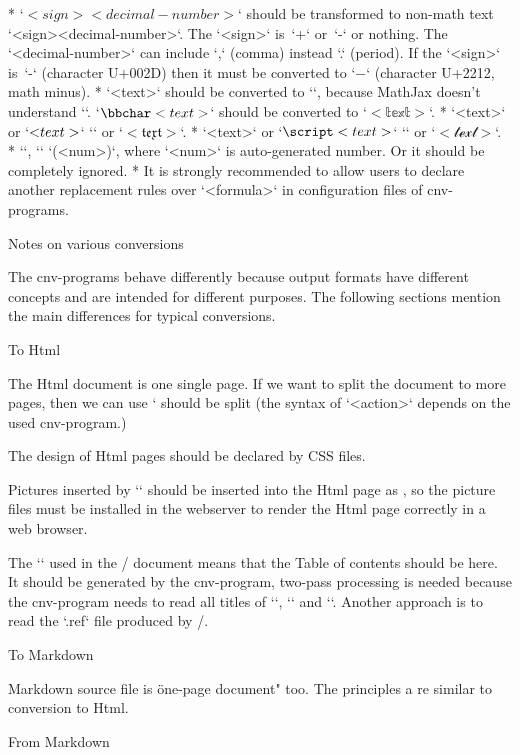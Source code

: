 \begitems
* `$<sign><decimal-number>$` should be transformed to non-math text
  `<sign><decimal-number>`. The `<sign>` is~`+` or~`-` or nothing.
  The `<decimal-number>` can include `,` (comma) instead `.` (period).
  If the `<sign>` is~`-` (character U+002D) then
  it must be converted to `−` (character U+2212, math minus).
* `{\bbchar <text>}` should be converted to ``, because
  MathJax doesn't understand `\bbchar`. `$\bbchar <text>$` should be
  converted to `$\mathbb{<text>}$`.
* `{\frak <text>}` or `$\frak <text>$` \:
  `` or `$\mathfrak{<text>}$`.
* `{\script <text>}` or `$\script <text>$` \:
  `` or `$\mathscr{<text>}$`.
* `\eqmark`, `\eqmark[<label>]` \: `\leqno (<num>)`, where `<num>` is
  auto-generated number. Or it should be completely ignored.
* It is strongly recommended to allow users to declare another replacement
  rules over `<formula>` in configuration files of cnv-programs.
\enditems


\sec Notes on various conversions

The cnv-programs behave differently because output formats have different
concepts and are intended for different purposes. The following sections
mention the main differences for typical conversions.

\secc To Html

The Html document is one single page. If we want to split the document to more
pages, then we can use `%
should be split (the syntax of `<action>` depends on the used cnv-program.)

The design of Html pages should be declared by CSS files.

Pictures inserted by `\inspic` should be inserted into the Html page as
, so the picture files must be installed in
the webserver to render the Html page correctly in a web browser.

The `\maketoc` used in the \OpTeX/ document means that the Table of contents should
be here. It should be generated by the cnv-program, two-pass processing is
needed because the cnv-program needs to read all titles of `\chap`, `\sec` and
`\secc`. Another approach is to read the `.ref` file produced by \OpTeX/.


\secc To Markdown

Markdown source file is \"one-page document" too. The principles a
re similar to conversion to Html.

\secc From Markdown

